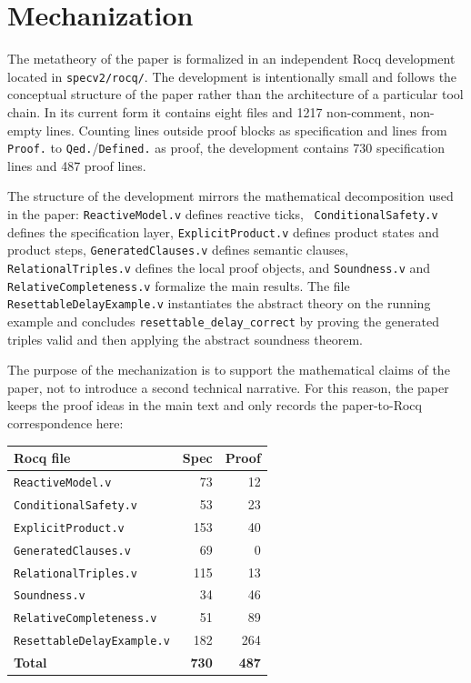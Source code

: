 \documentclass[acmsmall,screen]{acmart}
\theoremstyle{leftplain}
\theoremstyle{leftdefinition}
\theoremstyle{leftremark}
\begin{document}
\section{Mechanization}\label{sec:mechanization}
The metatheory of the paper is formalized in an independent Rocq development
located in \texttt{specv2/rocq/}. The development is intentionally small and
follows the conceptual structure of the paper rather than the architecture of a
particular tool chain. In its current form it contains eight files and 1217
non-comment, non-empty lines. Counting lines outside proof blocks as
specification and lines from \texttt{Proof.} to \texttt{Qed.}/\texttt{Defined.}
as proof, the development contains 730 specification lines and 487 proof lines.

The structure of the development mirrors the mathematical decomposition used in
the paper: \texttt{ReactiveModel.v} defines reactive ticks, \texttt{
ConditionalSafety.v} defines the specification layer, \texttt{ExplicitProduct.v}
defines product states and product steps, \texttt{GeneratedClauses.v} defines
semantic clauses, \texttt{RelationalTriples.v} defines the local proof objects,
and \texttt{Soundness.v} and \texttt{RelativeCompleteness.v} formalize the main
results. The file \texttt{ResettableDelayExample.v} instantiates the abstract
theory on the running example and concludes \texttt{resettable\_delay\_correct}
by proving the generated triples valid and then applying the abstract soundness
theorem.

The purpose of the mechanization is to support the mathematical claims of the
paper, not to introduce a second technical narrative. For this reason, the
paper keeps the proof ideas in the main text and only records the paper-to-Rocq
correspondence here:

\begin{center}
\begin{tabular}{lrr}
\textbf{Rocq file} & \textbf{Spec} & \textbf{Proof} \\
\hline
\texttt{ReactiveModel.v} & 73 & 12 \\
\texttt{ConditionalSafety.v} & 53 & 23 \\
\texttt{ExplicitProduct.v} & 153 & 40 \\
\texttt{GeneratedClauses.v} & 69 & 0 \\
\texttt{RelationalTriples.v} & 115 & 13 \\
\texttt{Soundness.v} & 34 & 46 \\
\texttt{RelativeCompleteness.v} & 51 & 89 \\
\texttt{ResettableDelayExample.v} & 182 & 264 \\
\hline
\textbf{Total} & \textbf{730} & \textbf{487}
\end{tabular}
\end{center}
\end{document}
